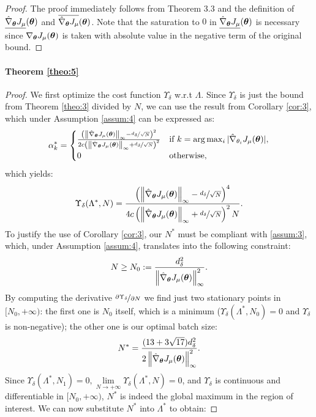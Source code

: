 \thirdtheorem*
\begin{proof}
The proof immediately follows from Theorem 3.3 and the definition of $\gradDown{\vtheta}$ and $\gradUp{\vtheta}$. Note that the saturation to $0$ in $\gradDown{\vtheta}$ is necessary since $\gradJ{\vtheta}$ is taken with absolute value in the negative term of the original bound.
\end{proof}

\paragraph{Theorem \ref{theo:5}}
\begin{proof}
We first optimize the cost function $\Upsilon_{\delta}$ w.r.t $\Lambda$. Since $\Upsilon_{\delta}$ is just the bound from Theorem \ref{theo:3} divided by $N$, we can use the result from Corollary \ref{cor:3}, which under Assumption \ref{assum:4} can be expressed as:
\[
\alpha_k^* = 
\begin{cases}
	\frac{
		\left(\norm[\infty]{\gradApp{\vtheta}} - \nicefrac{d_{\delta}}{\sqrt{N}}\right)^2}
		{2c
		\left(\norm[\infty]{\gradApp{\vtheta}} + \nicefrac{d_{\delta}}{\sqrt{N}}\right)^2} & 
		\text{if } k = \arg\max_i |\gradApp{\theta_i}|,	\\
		0 & \text{otherwise},
\end{cases}
\]
which yields:
\[
	\Upsilon_{\delta}(\Lambda^*,N) = 
	\frac{
		\left(\norm[\infty]{\gradApp{\vtheta}} - \nicefrac{d_{\delta}}{\sqrt{N}}\right)^4}
		{4c
		\left(\norm[\infty]{\gradApp{\vtheta}} + \nicefrac{d_{\delta}}{\sqrt{N}}\right)^2N}.
\]
To justify the use of Corollary \ref{cor:3}, our $N^*$ must be compliant with \ref{assum:3}, which, under Assumption \ref{assum:4}, translates into the following constraint:
\[
N \geq N_0 := \frac{d_{\delta}^2}{\norm[\infty]{\gradApp{\vtheta}}^2}.
\] 
By computing the derivative $\nicefrac{\partial\Upsilon_{\delta}}{\partial N}$ we find just two stationary points in $[N_0,+\infty)$: the first one is $N_0$ itself, which is a minimum ($\Upsilon_{\delta}(\Lambda^*,N_0) = 0$ and $\Upsilon_{\delta}$ is non-negative); the other one is our optimal batch size:
\[
	N^* =  \frac{(13+3\sqrt{17})d_{\delta}^2}{2\norm[\infty]{\gradApp{\vtheta}}^2}.
\]
Since $\Upsilon_{\delta}(\Lambda^*,N_1)=0, \lim\limits_{N \to +\infty}\Upsilon_{\delta} (\Lambda^*,N)= 0$, and $\Upsilon_{\delta}$ is continuous and differentiable in $[N_0,+\infty)$, $N^*$ is indeed the global maximum in the region of interest. We can now substitute $N^*$ into $\Lambda^*$ to obtain:

\end{proof}
